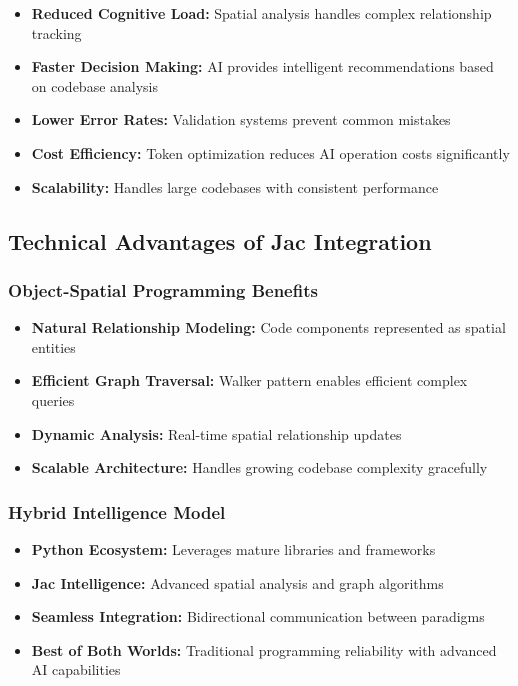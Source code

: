 \documentclass[12pt,a4paper]{article}
\begin{document}
\begin{itemize}
    \item \textbf{Reduced Cognitive Load:} Spatial analysis handles complex relationship tracking
    \item \textbf{Faster Decision Making:} AI provides intelligent recommendations based on codebase analysis
    \item \textbf{Lower Error Rates:} Validation systems prevent common mistakes
    \item \textbf{Cost Efficiency:} Token optimization reduces AI operation costs significantly
    \item \textbf{Scalability:} Handles large codebases with consistent performance
\end{itemize}

\subsection{Technical Advantages of Jac Integration}

\subsubsection{Object-Spatial Programming Benefits}
\begin{itemize}
    \item \textbf{Natural Relationship Modeling:} Code components represented as spatial entities
    \item \textbf{Efficient Graph Traversal:} Walker pattern enables efficient complex queries
    \item \textbf{Dynamic Analysis:} Real-time spatial relationship updates
    \item \textbf{Scalable Architecture:} Handles growing codebase complexity gracefully
\end{itemize}

\subsubsection{Hybrid Intelligence Model}
\begin{itemize}
    \item \textbf{Python Ecosystem:} Leverages mature libraries and frameworks
    \item \textbf{Jac Intelligence:} Advanced spatial analysis and graph algorithms
    \item \textbf{Seamless Integration:} Bidirectional communication between paradigms
    \item \textbf{Best of Both Worlds:} Traditional programming reliability with advanced AI capabilities
\end{itemize}
\end{document}
